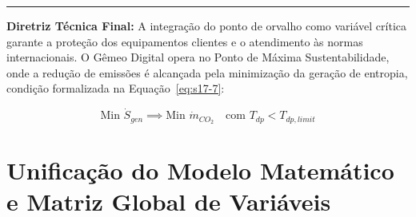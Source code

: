 \documentclass[12pt,a4paper]{article}
\numberwithin{equation}{section}
\numberwithin{table}{section}
\numberwithin{figure}{section}
\begin{document}
\vspace{1em}
\hrule
\vspace{1em}

\textbf{Diretriz Técnica Final:} A integração do ponto de orvalho como variável crítica garante a proteção dos equipamentos clientes e o atendimento às normas internacionais. O Gêmeo Digital opera no Ponto de Máxima Sustentabilidade, onde a redução de emissões é alcançada pela minimização da geração de entropia, condição formalizada na Equação~\eqref{eq:s17-7}:

\begin{equation}\label{eq:s17-7}
\boxed{\text{Min } \dot{S}_{gen} \implies \text{Min } \dot{m}_{CO_2} \quad \text{com } T_{dp} < T_{dp,limit}}
\end{equation}




\clearpage
\section{Unificação do Modelo Matemático e Matriz Global de Variáveis}

\end{document}
